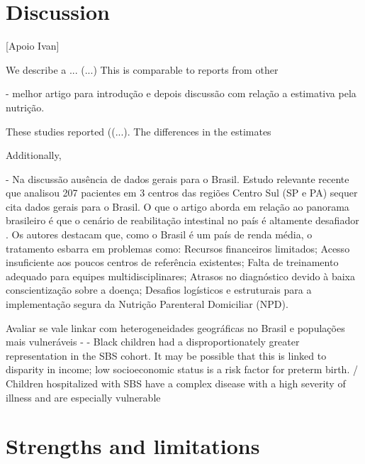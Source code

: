 \documentclass[pdflatex,sn-mathphys-num]{sn-jnl}
\theoremstyle{thmstyleone}%
\theoremstyle{thmstyletwo}%
\theoremstyle{thmstylethree}%
\begin{document}
\section{Discussion}\label{sec4}

[Apoio Ivan]

We describe a ... (...) This is comparable to reports from other

\cite{khokhar2025global} - melhor artigo para introdução e depois discussão com relação a estimativa pela nutrição.

These studies reported ((...). The differences in the estimates

Additionally,

\cite{leite2025multicenter} - Na discussão ausência de dados gerais para o Brasil. Estudo relevante recente que analisou 207 pacientes em 3 centros das regiões Centro Sul (SP e PA) sequer cita dados gerais para o Brasil. O que o artigo aborda em relação ao panorama brasileiro é que o cenário de reabilitação intestinal no país é altamente desafiador
. Os autores destacam que, como o Brasil é um país de renda média, o tratamento esbarra em problemas como:
Recursos financeiros limitados;
Acesso insuficiente aos poucos centros de referência existentes;
Falta de treinamento adequado para equipes multidisciplinares;
Atrasos no diagnóstico devido à baixa conscientização sobre a doença;
Desafios logísticos e estruturais para a implementação segura da Nutrição Parenteral Domiciliar (NPD).


Avaliar se vale linkar com heterogeneidades geográficas no Brasil e populações mais vulneráveis - \cite{pant2017epidemiology} - Black children had a disproportionately greater representation in the SBS cohort. It may be possible that this is linked to disparity in income; low socioeconomic status is a risk factor for preterm birth. / Children hospitalized with SBS have a complex disease with a
high severity of illness and are especially vulnerable


\section*{Strengths and limitations}  
\end{document}
